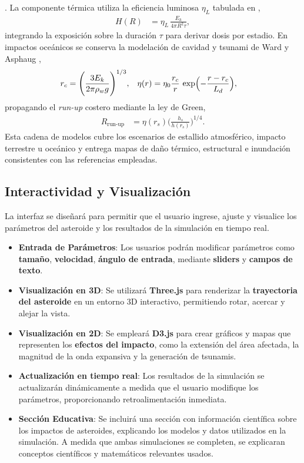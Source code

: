 \documentclass[conference]{IEEEtran}
\begin{document}
\begin{itemize}
	      \cite{ufc334002}. La componente térmica utiliza la eficiencia luminosa
	      $\eta_L$ tabulada en \cite{collins2005},
	      \begin{align}
		      H(R) & = \eta_L\,\frac{E_k}{4 \pi R^2 \tau},
	      \end{align}
	      integrando la exposición sobre la duración $\tau$ para derivar dosis
	      por estadio. En impactos oceánicos se conserva la modelación de cavidad y
	      tsunami de Ward y Asphaug \cite{ward2000},
	      \begin{align}
		      r_c     & = \Biggl(\frac{3 E_k}{2 \pi \rho_w g}\Biggr)^{1/3}, &
		      \eta(r) & = \eta_0 \frac{r_c}{r}\,
		      \exp\Bigl(-\frac{r - r_c}{L_d}\Bigr),
	      \end{align}
	      propagando el \textit{run-up} costero mediante la ley de Green,
	      \begin{align}
		      R_{\text{run-up}} & = \eta(r_s)
		      \Biggl(\frac{h_s}{h(r_s)}\Biggr)^{1/4}.
	      \end{align}
	      Esta cadena de modelos cubre los escenarios de estallido atmosférico,
	      impacto terrestre u oceánico y entrega mapas de daño térmico, estructural
	      e inundación consistentes con las referencias empleadas.
\end{itemize}

\subsection{Interactividad y Visualización}
La interfaz se diseñará para permitir que el usuario ingrese, ajuste y
visualice los parámetros del asteroide y los resultados de la simulación en
tiempo real.
\begin{itemize}
	\item \textbf{Entrada de Parámetros}: Los usuarios podrán modificar parámetros
	      como \textbf{tamaño}, \textbf{velocidad}, \textbf{ángulo de entrada}, mediante
	      \textbf{sliders} y \textbf{campos de texto}.
	\item \textbf{Visualización en 3D}: Se utilizará \textbf{Three.js} para
	      renderizar la \textbf{trayectoria del asteroide} en un entorno 3D
	      interactivo, permitiendo rotar, acercar y alejar la vista.
	\item \textbf{Visualización en 2D}: Se empleará \textbf{D3.js} para crear gráficos y mapas que
	      representen los \textbf{efectos del impacto}, como la extensión del área afectada,
	      la magnitud de la onda expansiva y la generación de tsunamis.
	\item \textbf{Actualización en tiempo real}: Los resultados de la simulación se
	      actualizarán dinámicamente a medida que el usuario modifique los parámetros,
	      proporcionando retroalimentación inmediata.
	\item \textbf{Sección Educativa}: Se incluirá una sección con información
	      científica sobre los impactos de asteroides, explicando los modelos y
	      datos utilizados en la simulación. A medida que ambas simulaciones se
	      completen, se explicaran conceptos científicos y matemáticos relevantes
	      usados.
\end{itemize}
\end{document}
